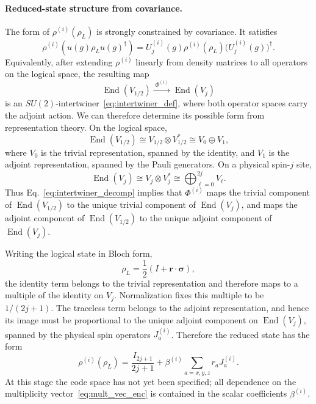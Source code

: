 \documentclass[10pt,twocolumn,superscriptaddress,aps,amsmath,amssymb,citeautoscript,floatfix,prx,longbibliography]{revtex4-2}
\theoremstyle{plain}
\theoremstyle{plain}
\theoremstyle{plain}
\theoremstyle{plain}
\theoremstyle{plain}
\theoremstyle{plain}
\begin{document}
\paragraph{Reduced-state structure from covariance.}
The form of $\rho^{(i)}(\rho_L)$ is strongly constrained by covariance. It satisfies
\begin{equation}\label{eq:reduced-state_cov_cond}
    \rho^{(i)}\!\left(u(g)\rho_Lu(g)^\dagger\right)
    =
    U_j^{(i)}(g)\rho^{(i)}(\rho_L)\bigl(U_j^{(i)}(g)\bigr)^\dagger .
\end{equation}
Equivalently, after extending $\rho^{(i)}$ linearly from density matrices to all operators on the logical space, the resulting map
\[
    \operatorname{End}(V_{1/2})
    \xrightarrow{\;\Phi^{(i)}\;}
    \operatorname{End}(V_j)
\]
is an $SU(2)$-intertwiner~\eqref{eq:intertwiner_def}, where both operator spaces carry the adjoint action. We can therefore determine its possible form from representation theory. On the logical space,
\[
    \operatorname{End}(V_{1/2})
    \cong
    V_{1/2}\otimes V_{1/2}^*
    \cong
    V_0\oplus V_1,
\]
where $V_0$ is the trivial representation, spanned by the identity, and $V_1$ is the adjoint representation, spanned by the Pauli generators. On a physical spin-$j$ site,
\[
    \operatorname{End}(V_j)
    \cong
    V_j\otimes V_j^*
    \cong
    \bigoplus_{\ell=0}^{2j} V_\ell .
\]
Thus Eq.~\eqref{eq:intertwiner_decomp} implies that $\Phi^{(i)}$ maps the trivial component of $\operatorname{End}(V_{1/2})$ to the unique trivial component of $\operatorname{End}(V_j)$, and maps the adjoint component of $\operatorname{End}(V_{1/2})$ to the unique adjoint component of $\operatorname{End}(V_j)$.

Writing the logical state in Bloch form,
\[
    \rho_L=\frac12(I+\mathbf r\cdot\boldsymbol\sigma),
\]
the identity term belongs to the trivial representation and therefore maps to a multiple of the identity on $V_j$. Normalization fixes this multiple to be $1/(2j+1)$. The traceless term belongs to the adjoint representation, and hence its image must be proportional to the unique adjoint component on $\operatorname{End}(V_j)$, spanned by the physical spin operators $J_a^{(i)}$. Therefore the reduced state has the form
\begin{equation}\label{eq:reduced_state_beta}
    \rho^{(i)}(\rho_L)
    =
    \frac{I_{2j+1}}{2j+1}
    +
    \beta^{(i)}
    \sum_{a=x,y,z} r_a J_a^{(i)} .
\end{equation}
At this stage the code space has not yet been specified; all dependence on the multiplicity vector~\eqref{eq:mult_vec_enc} is contained in the scalar coefficients $\beta^{(i)}$.
\end{document}
